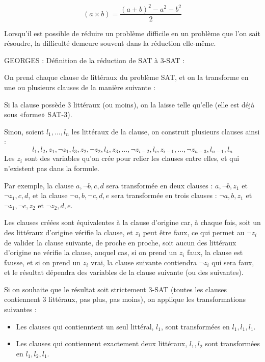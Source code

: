 \documentclass{article}
\begin{document}
$$(a \times b) = \dfrac{(a + b)^2 - a^2 - b^2}{2}$$


Lorsqu'il est possible de réduire un problème difficile en un problème que l'on sait résoudre, la difficulté demeure souvent dans la réduction elle-même.

GEORGES : Définition de la réduction de SAT à 3-SAT :

On prend chaque clause de littéraux du problème SAT, et on la transforme en une ou plusieurs clauses de la manière suivante :

Si la clause possède 3 littéraux (ou moins), on la laisse telle qu'elle (elle est déjà sous «forme» SAT-3).

Sinon, soient $l_1, \dots, l_n$ les littéraux de la clause, on construit plusieurs clauses ainsi :
$$
{l_1, l_2, z_1}, {\lnot z_1, l_3, z_2}, {\lnot z_2, l_4, z_3}, \dots, {\lnot z_{i-2}, l_{i}, z_{i-1}}, \dots, {\lnot z_{n-3}, l_{n-1}, l_{n}}
$$
Les $z_i$ sont des variables %
qu'on crée pour relier les clauses entre elles, et qui n'existent pas dans la formule.

Par exemple, la clause ${a, \lnot b, c, d}$ sera transformée en deux clauses : ${a, \lnot b, z_1}$ et ${\lnot z_1, c, d}$, et la clause
${\lnot a, b, \lnot c, d, e}$ sera transformée en trois clauses : ${\lnot a, b, z_1}$ et ${\lnot z_1, \lnot c, z_2}$ et ${\lnot z_2, d, e}$.

Les clauses créées sont équivalentes à la clause d'origine car, à chaque fois, soit un des littéraux d'origine vérifie la clause, et $z_i$
peut être faux, ce qui permet au $\lnot z_i$ de valider la clause suivante, de proche en proche, soit aucun des littéraux d'origine ne
vérifie la clause, auquel cas, si on prend un $z_i$ faux, la clause est fausse, et si on prend un $z_i$ vrai, la clause suivante contiendra
$\lnot z_i$ qui sera faux, et le résultat dépendra des variables de la clause suivante (ou des suivantes). %

Si on souhaite que le résultat soit strictement 3-SAT (toutes les clauses contiennent 3 littéraux, pas plus, pas moins), on applique les transformations suivantes :
\begin{itemize}
\item Les clauses qui contienntent un seul littéral, ${l_1}$, sont transformées en ${l_1, l_1, l_1}$.
\item Les clauses qui contiennent exactement deux littéraux, ${l_1, l_2}$ sont transformées en ${l_1, l_2, l_1}$.
\end{itemize}
\end{document}
